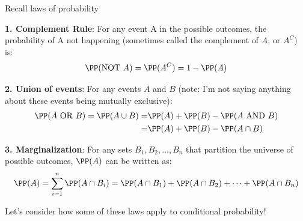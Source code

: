 \documentclass[compress, 8pt]{beamer}
\begin{document}
\begin{frame}{Recall laws of probability}

\textbf{1. Complement Rule}: For any event A in the possible outcomes, the probability of A not happening (sometimes called the complement of $A$, or $A^C$) is:
\begin{equation*}
    \PP (\text{NOT } A) = \PP (A^C) = 1 - \PP(A)
\end{equation*}

\textbf{2. Union of events}: For any events $A$ and $B$ (note: I'm not saying anything about these events being mutually exclusive): 
\begin{align*}
    \PP (A \text{ OR } B) = \PP (A \cup B) =& \PP (A) + \PP (B) - \PP (A \text{ AND } B) \\
    =& \PP (A) + \PP (B) - \PP (A \cap B)
\end{align*}

\textbf{3. Marginalization}: For any sets $B_1, B_2, \dots, B_n$ that partition the universe of possible outcomes, $\PP (A)$ can be written as:
\begin{equation*}
    \PP (A) = \sum_{i=1}^n \PP (A \cap B_i) = \PP (A \cap B_1) + \PP (A \cap B_2) + \dots + \PP (A \cap B_n) 
\end{equation*}

\vspace{3ex}
Let's consider how some of these laws apply to conditional probability!

\end{frame}
\end{document}
